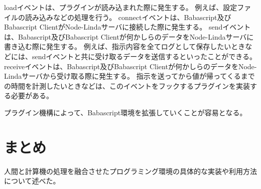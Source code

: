 loadイベントは、プラグインが読み込まれた際に発生する。
例えば、設定ファイルの読み込みなどの処理を行う。
connectイベントは、Babascript及びBabascript
ClientがNode-Lindaサーバに接続した際に発生する。
sendイベントは、Babascript及びBabascript
Clientが何かしらのデータをNode-Lindaサーバに書き込む際に発生する。
例えば、指示内容を全てログとして保存したいときなどには、sendイベントと共に受け取るデータを送信するといったことができる。
receiveイベントは、Babascript及びBabascript
Clientが何かしらのデータをNode-Lindaサーバから受け取る際に発生する。
指示を送ってから値が帰ってくるまでの時間を計測したいときなどは、このイベントをフックするプラグインを実装する必要がある。

プラグイン機構によって、Babascript環境を拡張していくことが容易となる。

\section{まとめ}\label{ux307eux3068ux3081}

人間と計算機の処理を融合させたプログラミング環境の具体的な実装や利用方法について述べた。
